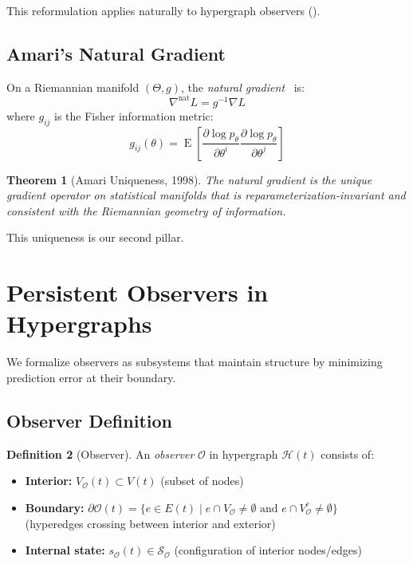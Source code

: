 \documentclass[11pt,a4paper]{article}
\theoremstyle{plain}
\newtheorem{theorem}{Theorem}[section]
\theoremstyle{definition}
\newtheorem{definition}[theorem]{Definition}
\theoremstyle{remark}
\DeclareMathOperator{\Exp}{E}
\newcommand{\del}{\partial}
\newcommand{\grad}{\nabla}
\newcommand{\Scal}{\mathcal{S}}
\newcommand{\Ocal}{\mathcal{O}}
\newcommand{\HG}{\mathcal{H}}
\newcommand{\boundary}{\partial}
\begin{document}
This reformulation applies naturally to hypergraph observers ().

\subsection{Amari's Natural Gradient}

On a Riemannian manifold $(\Theta, g)$, the \emph{natural gradient}~\cite{amari1998natural} is:
\begin{equation}
\grad^{\text{nat}} L = g^{-1} \grad L
\end{equation}
where $g_{ij}$ is the Fisher information metric:
\begin{equation}
g_{ij}(\theta) = \Exp\left[ \frac{\del \log p_\theta}{\del \theta^i} \frac{\del \log p_\theta}{\del \theta^j} \right]
\end{equation}

\begin{theorem}[Amari Uniqueness, 1998]
\label{thm:amari}
The natural gradient is the \emph{unique} gradient operator on statistical manifolds that is reparameterization-invariant and consistent with the Riemannian geometry of information.
\end{theorem}

This uniqueness is our second pillar.


\section{Persistent Observers in Hypergraphs}
\label{sec:observers}

We formalize observers as subsystems that maintain structure by minimizing prediction error at their boundary.

\subsection{Observer Definition}

\begin{definition}[Observer]
\label{def:observer}
An \emph{observer} $\Ocal$ in hypergraph $\HG(t)$ consists of:
\begin{itemize}[noitemsep]
\item \textbf{Interior:} $V_\Ocal(t) \subset V(t)$ (subset of nodes)
\item \textbf{Boundary:} $\boundary \Ocal(t) = \{ e \in E(t) \mid e \cap V_\Ocal \neq \emptyset \text{ and } e \cap V_\Ocal^c \neq \emptyset \}$ \\
(hyperedges crossing between interior and exterior)
\item \textbf{Internal state:} $s_\Ocal(t) \in \Scal_\Ocal$ (configuration of interior nodes/edges)
\end{itemize}
\end{definition}
\end{document}
